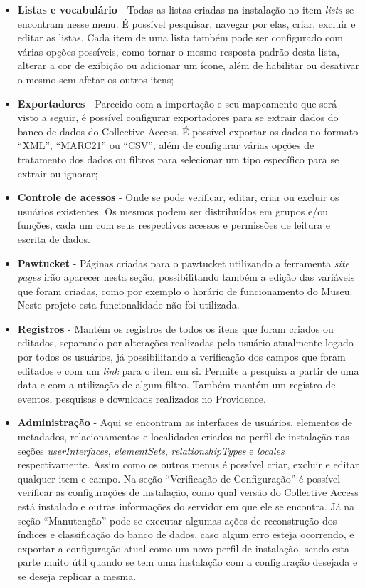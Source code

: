 \documentclass[a4paper,12pt,oneside,onecolumn,final,fleqn]{repUERJ}
\begin{document}
\begin{itemize}
	\item \textbf{Listas e vocabulário} - Todas as listas criadas na instalação no item \textit{lists} se encontram nesse menu. É possível pesquisar, navegar por elas, criar, excluir e editar as listas. Cada item de uma lista também pode ser configurado com várias opções possíveis, como tornar o mesmo resposta padrão desta lista, alterar a cor de exibição ou adicionar um ícone, além de habilitar ou desativar o mesmo sem afetar os outros itens;
	\item \textbf{Exportadores} - Parecido com a importação e seu mapeamento que será visto a seguir, é possível configurar exportadores para se extrair dados do banco de dados do Collective Access. É possível exportar os dados no formato ``XML'', ``MARC21'' ou ``CSV'', além de configurar várias opções de tratamento dos dados ou filtros para selecionar um tipo específico para se extrair ou ignorar;
	\item \textbf{Controle de acessos} - Onde se pode verificar, editar, criar ou excluir os usuários existentes. Os mesmos podem ser distribuídos em grupos e/ou funções, cada um com seus respectivos acessos e permissões de leitura e escrita de dados.
	\item \textbf{Pawtucket} - Páginas criadas para o pawtucket utilizando a ferramenta \textit{site pages} irão aparecer nesta seção, possibilitando também a edição das variáveis que foram criadas, como por exemplo o horário de funcionamento do Museu. Neste projeto esta funcionalidade não foi utilizada.
	\item \textbf{Registros} - Mantém os registros de todos os itens que foram criados ou editados, separando por alterações realizadas pelo usuário atualmente logado por todos os usuários, já possibilitando a verificação dos campos que foram editados e com um \textit{link} para o item em si. Permite a pesquisa a partir de uma data e com a utilização de algum filtro. Também mantém um registro de eventos, pesquisas e downloads realizados no Providence.
	\item \textbf{Administração} - Aqui se encontram as interfaces de usuários, elementos de metadados, relacionamentos e localidades criados no perfil de instalação nas seções \textit{userInterfaces}, \textit{elementSets}, \textit{relationshipTypes} e \textit{locales} respectivamente. Assim como os outros menus é possível criar, excluir e editar qualquer item e campo. Na seção ``Verificação de Configuração'' é possível verificar as configurações de instalação, como qual versão do Collective Access está instalado e outras informações do servidor em que ele se encontra. Já na seção ``Manutenção'' pode-se executar algumas ações de reconstrução dos índices e classificação do banco de dados, caso algum erro esteja ocorrendo, e exportar a configuração atual como um novo perfil de instalação, sendo esta parte muito útil quando se tem uma instalação com a configuração desejada e se deseja replicar a mesma.
\end{itemize}
\end{document}
